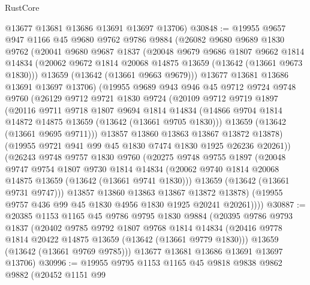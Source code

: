 \begin{lexlean}{RustCore}
\begin{coremodule}
      @13677
      @13681
      @13686
      @13691
      @13697
      @13706)
@30848 := @19955
    @9657
    @947
    @1166
    @45
    @9680
    @9762
    @9786
    @9884
    (@26082
      @9680
      @9689
      @1830
      @9762
      (@20041
        @9680
        @9687
        @1837
        (@20048
          @9679
          @9686
          @1807
          @9662
          @1814
          @14834
          (@20062 @9672 @1814 @20068 @14875 @13659 (@13642 (@13661 @9673 @1830)))
          @13659
          (@13642 (@13661 @9663 @9679)))
        @13677
        @13681
        @13686
        @13691
        @13697
        @13706)
      (@19955
        @9689
        @943
        @946
        @45
        @9712
        @9724
        @9748
        @9760
        (@26129
          @9712
          @9721
          @1830
          @9724
          (@20109
            @9712
            @9719
            @1897
            (@20116
              @9711
              @9718
              @1807
              @9694
              @1814
              @14834
              (@14866 @9704 @1814 @14872 @14875 @13659 (@13642 (@13661 @9705 @1830)))
              @13659
              (@13642 (@13661 @9695 @9711)))
            @13857
            @13860
            @13863
            @13867
            @13872
            @13878)
          (@19955 @9721 @941 @99 @45 @1830 @7474 @1830 @1925 @26236 @20261))
        (@26243
          @9748
          @9757
          @1830
          @9760
          (@20275
            @9748
            @9755
            @1897
            (@20048
              @9747
              @9754
              @1807
              @9730
              @1814
              @14834
              (@20062 @9740 @1814 @20068 @14875 @13659 (@13642 (@13661 @9741 @1830)))
              @13659
              (@13642 (@13661 @9731 @9747)))
            @13857
            @13860
            @13863
            @13867
            @13872
            @13878)
          (@19955 @9757 @436 @99 @45 @1830 @4956 @1830 @1925 @20241 @20261))))
@30887 := @20385
    @1153
    @1165
    @45
    @9786
    @9795
    @1830
    @9884
    (@20395
      @9786
      @9793
      @1837
      (@20402
        @9785
        @9792
        @1807
        @9768
        @1814
        @14834
        (@20416 @9778 @1814 @20422 @14875 @13659 (@13642 (@13661 @9779 @1830)))
        @13659
        (@13642 (@13661 @9769 @9785)))
      @13677
      @13681
      @13686
      @13691
      @13697
      @13706)
@30996 := @19955
    @9795
    @1153
    @1165
    @45
    @9818
    @9838
    @9862
    @9882
    (@20452
      @1151
      @99

\end{coremodule}
\end{lexlean}
